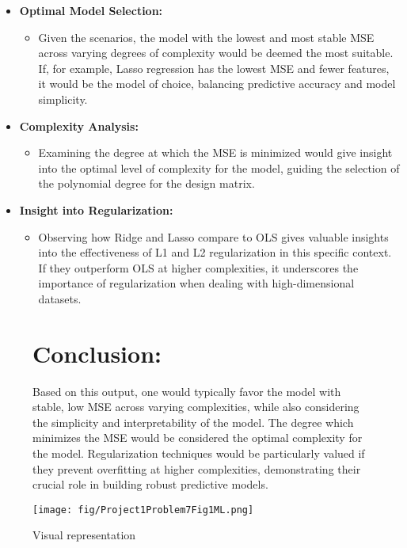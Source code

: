 \documentclass{article}
\begin{document}
\begin{itemize}
   \item \textbf{Optimal Model Selection:}
      \begin{itemize}
         \item Given the  scenarios, the model with the lowest and most stable MSE across varying degrees of complexity would be deemed the most suitable. If, for example, Lasso regression has the lowest MSE and fewer features, it would be the model of choice, balancing predictive accuracy and model simplicity.
      \end{itemize}

   \item \textbf{Complexity Analysis:}
      \begin{itemize}
         \item Examining the degree at which the MSE is minimized would give insight into the optimal level of complexity for the model, guiding the selection of the polynomial degree for the design matrix.
      \end{itemize}

   \item \textbf{Insight into Regularization:}
      \begin{itemize}
         \item Observing how Ridge and Lasso compare to OLS gives valuable insights into the effectiveness of L1 and L2 regularization in this specific context. If they outperform OLS at higher complexities, it underscores the importance of regularization when dealing with high-dimensional datasets.
      \end{itemize}
      
\end{itemize}


\begin{figure}[htbp]
    \centering
    \begin{minipage}{0.35\textwidth}
        \section*{Conclusion:}
        Based on this output, one would typically favor the model with stable, low MSE across varying complexities, while also considering the simplicity and interpretability of the model. The degree which minimizes the MSE would be considered the optimal complexity for the model. Regularization techniques would be particularly valued if they prevent overfitting at higher complexities, demonstrating their crucial role in building robust predictive models.
    \end{minipage}%
    \hfill
    \begin{minipage}{0.6\textwidth}
        \texttt{[image: fig/Project1Problem7Fig1ML.png]}
        \caption{Visual representation}
        \label{fig:python-code}
    \end{minipage}
\end{figure}
\end{document}
